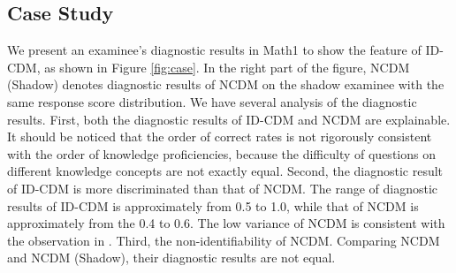 \documentclass[sigconf]{acmart}
\begin{document}
\begin{table}[t]\centering 
  \caption{Dataset summary.}\label{tab:dataset}\vspace{-0.4cm}
  \vspace{-10pt}
\end{table}

\subsection{Case Study}
\par We present an examinee's diagnostic results in Math1 to show the feature of ID-CDM, as shown in Figure \ref{fig:case}. In the right part of the figure, NCDM (Shadow) denotes diagnostic results of NCDM on the shadow examinee with the same response score distribution. We have several analysis of the diagnostic results. First, both the diagnostic results of ID-CDM and NCDM are explainable. It should be noticed that the order of correct rates is not rigorously consistent with the order of knowledge proficiencies, because the difficulty of questions on different knowledge concepts are not exactly equal. Second, the diagnostic result of ID-CDM is more discriminated than that of NCDM. The range of diagnostic results of ID-CDM is approximately from 0.5 to 1.0, while that of NCDM is approximately from the 0.4 to 0.6. The low variance of NCDM is consistent with the observation in \cite{WangF2022}. Third, the non-identifiability of NCDM. Comparing NCDM and NCDM (Shadow), their diagnostic results are not equal.
\end{document}
